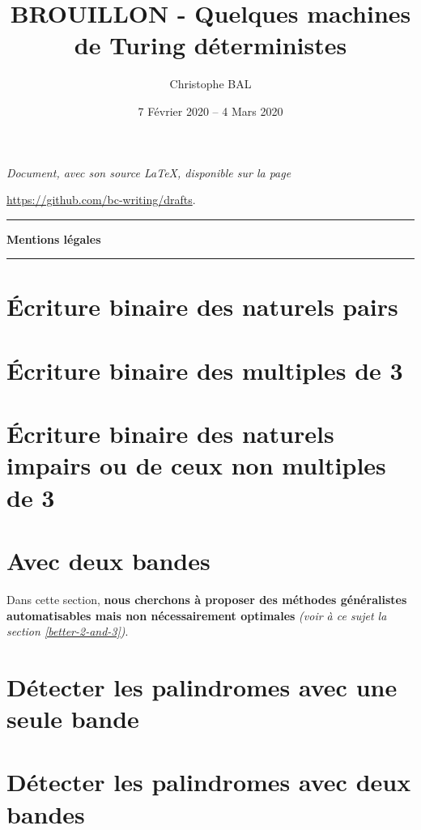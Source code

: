 \documentclass[a4paper, 12pt]{scrartcl}
\begin{document}
\title{BROUILLON - Quelques machines de Turing déterministes}
\author{Christophe BAL}
\date{7 Février 2020 -- 4 Mars 2020}

\maketitle

\begin{center}
	\itshape
	Document, avec son source \LaTeX, disponible sur la page
	
	\url{https://github.com/bc-writing/drafts}.
\end{center}


\bigskip


\begin{center}
	\hrule\vspace{.3em}
	{
		\fontsize{1.35em}{1em}\selectfont
		\textbf{Mentions \og légales \fg}
	}
			
	\vspace{0.45em}
	\doclicenseThis
	\hrule
\end{center}


\bigskip
\setcounter{tocdepth}{2}
\tableofcontents



\newpage
\section{Écriture binaire des naturels pairs}

	


\newpage
\section{Écriture binaire des multiples de 3} \label{divisibility-by-3}

	


\newpage
\section{Écriture binaire des naturels impairs ou de ceux non multiples de 3}

	


\newpage
\section{Avec deux bandes}

	Dans cette section, \textbf{nous cherchons à proposer des méthodes généralistes automatisables mais non nécessairement optimales}
	\emph{(voir à ce sujet la section \ref{better-2-and-3})}.

	


\newpage
\section{Détecter les palindromes avec une seule bande}

	



\newpage
\section{Détecter les palindromes avec deux bandes}

	
\end{document}
